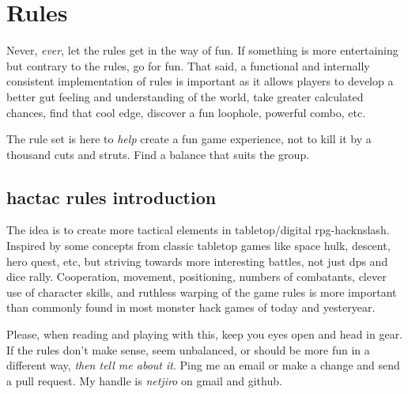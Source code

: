 

%
%


\cleardoublepage



\chapter*{Rules}

Never, \emph{ever}, let the rules get in the way of fun. If something is more entertaining but contrary to the rules, go for fun. That said, a functional and internally consistent implementation of rules is important as it allows players to develop a better gut feeling and understanding of the world, take greater calculated chances, find that cool edge, discover a fun loophole, powerful combo, etc.

The rule set is here to \emph{help} create a fun game experience, not to kill it by a thousand cuts and struts. Find a balance that suits the group. 


\section*{hactac rules introduction}

The idea is to create more tactical elements in tabletop/digital rpg-hacknslash. Inspired by some concepts from classic tabletop games like space hulk, descent, hero quest, etc, but striving towards more interesting battles, not just dps and dice rally.
Cooperation, movement, positioning, numbers of combatants, clever use of character skills, and ruthless warping of the game rules is more important than commonly found in most monster hack games of today and yesteryear.

Please, when reading and playing with this, keep you eyes open and head in gear. If the rules don't make sense, seem unbalanced, or should be more fun in a different way, \emph{then tell me about it}. Ping me an email or make a change and send a pull request. My handle is \emph{netjiro} on gmail and github.

